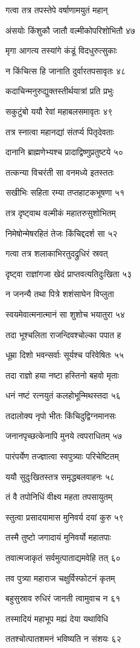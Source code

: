 गत्वा तत्र तपस्तेपे वर्षाणामयुतं महान्

अंसयोः किंशुकौ जातौ वल्मीकोपरिशोभितौ ४७

मृगा आगत्य तस्यांगे कंडूं विदधुरुत्सुकाः

न किंचित्स हि जानाति दुर्वारतपसावृतः ४८

कदाचिन्मनुरुद्युक्तस्तीर्थयात्रां प्रति प्रभुः

सकुटुंबो ययौ रेवां महाबलसमावृतः ४९

तत्र स्नात्वा महानद्यां संतर्प्य पितृदेवताः

दानानि ब्राह्मणेभ्यश्च प्रादाद्विष्णुप्रतुष्टये ५०

तत्कन्या विचरंती सा वनमध्ये इतस्ततः

सखीभिः सहिता रम्या तप्तहाटकभूषणा ५१

तत्र दृष्ट्वाथ वल्मीकं महातरुसुशोभितम्

निमेषोन्मेषरहितं तेजः किंचिद्ददर्श सा ५२

गत्वा तत्र शलाकाभिरतुदद्रुधिरं स्रवत्

दृष्ट्वा राज्ञांगजा खेदं प्राप्तवत्यतिदुःखिता ५३

न जनन्यै तथा पित्रे शशंसाघेन विप्लुता

स्वयमेवात्मनात्मानं सा शुशोच भयातुरा ५४

तदा भूश्चलिता राजन्दिवश्चोल्का पपात ह

धूम्रा दिशो भवन्सर्वाः सूर्यश्च परिवेषितः ५५

तदा राज्ञो हया नष्टा हस्तिनो बहवो मृताः

धनं नष्टं रत्नयुतं कलहोभून्मिथस्तदा ५६

तदालोक्य नृपो भीतः किंचिदुद्विग्नमानसः

जनानपृच्छत्केनापि मुनये त्वपराधितम् ५७

पारंपर्येण तज्ज्ञात्वा स्वपुत्र्याः परिचेष्टितम्

ययौ सुदुःखितस्तत्र समृद्धबलवाहनः ५८

तं वै तपोनिधिं वीक्ष्य महता तपसायुतम्

स्तुत्वा प्रसादयामास मुनिवर्य दयां कुरु ५९

तस्मै तुष्टो जगादायं मुनिवर्यो महातपाः

तवात्मजाकृतं सर्वमुत्पाताद्यमवेहि तत् ६०

तव पुत्र्या महाराज चक्षुर्विस्फोटनं कृतम्

बहुसुस्राव रुधिरं जानती त्वामुवाच न ६१

तस्मादियं महाभूप मह्यं देया यथाविधि

ततश्चोत्पातशमनं भविष्यति न संशयः ६२

